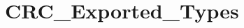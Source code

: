\hypertarget{group__CRC__Exported__Types}{
\section{CRC\_\-Exported\_\-Types}
\label{group__CRC__Exported__Types}
}
